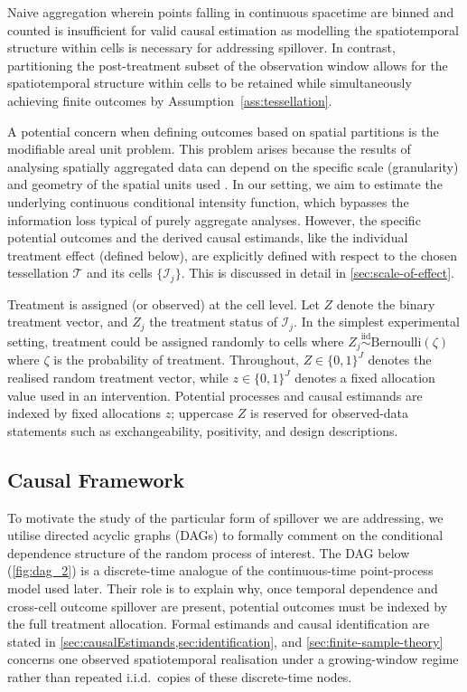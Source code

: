\documentclass{statsoc}
\newcommand{\1}{\mathbbm{1}}
\begin{document}
Naive aggregation wherein points falling in continuous spacetime are binned and counted is insufficient for valid causal estimation as modelling the spatiotemporal structure within cells is necessary for addressing spillover. In contrast, partitioning the post-treatment subset of the observation window allows for the spatiotemporal structure within cells to be retained while simultaneously achieving finite outcomes by Assumption~\ref{ass:tessellation}.

A potential concern when defining outcomes based on spatial partitions is the modifiable areal unit problem. This problem arises because the results of analysing spatially aggregated data can depend on the specific scale (granularity) and geometry of the spatial units used \citep{fotheringham1991modifiable}. %
In our setting, we aim to estimate the underlying continuous conditional intensity function, which bypasses the information loss typical of purely aggregate analyses. However, the specific potential outcomes and the derived causal estimands, like the individual treatment effect (defined below), are explicitly defined with respect to the chosen tessellation $\mathcal{T}$ and its cells $\{\mathcal{I}_j\}$. This is discussed in detail in \cref{sec:scale-of-effect}. 

Treatment is assigned (or observed) at the cell level. Let $Z$ denote the binary treatment vector, and $Z_j$ the treatment status of $\mathcal{I}_j$. In the simplest experimental setting, treatment could be assigned randomly to cells where $Z_j\overset{\text{iid}}{\sim}\text{Bernoulli}(\zeta)$ where $\zeta$ is the probability of treatment. Throughout, \(Z\in\{0,1\}^J\) denotes the realised random treatment vector, while \(z\in\{0,1\}^J\) denotes a fixed allocation value used in an intervention. Potential processes and causal estimands are indexed by fixed allocations \(z\); uppercase \(Z\) is reserved for observed-data statements such as exchangeability, positivity, and design descriptions.

\subsection{Causal Framework}\label{sec:causal-framework-dag}
To motivate the study of the particular form of spillover we are addressing, we utilise directed acyclic graphs (DAGs) \citep{pearl2009causal} to formally comment on the conditional dependence structure of the random process of interest. The DAG below (\cref{fig:dag_2}) is a discrete-time analogue of the continuous-time point-process model used later. Their role is to explain why, once temporal dependence and cross-cell outcome spillover are present, potential outcomes must be indexed by the full treatment allocation. Formal estimands and causal identification are stated in \cref{sec:causalEstimands,sec:identification}, and \cref{sec:finite-sample-theory} concerns one observed spatiotemporal realisation under a growing-window regime rather than repeated i.i.d.\ copies of these discrete-time nodes.
\end{document}
